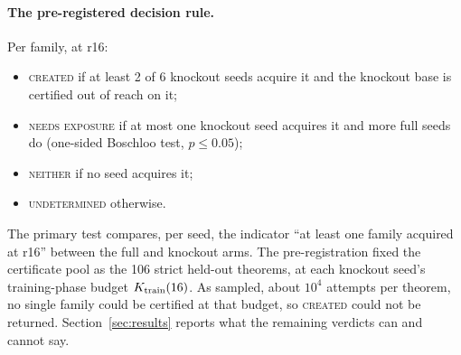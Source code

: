 \paragraph{The pre-registered decision rule.} Per family, at r16:
\begin{itemize}
\item \textsc{created} if at least 2 of 6 knockout seeds acquire it and the knockout base is certified out of reach on
it;
\item \textsc{needs exposure} if at most one knockout seed acquires it and more full seeds do (one-sided Boschloo test,
$p \leq 0.05$);
\item \textsc{neither} if no seed acquires it;
\item \textsc{undetermined} otherwise.
\end{itemize}
The primary test compares, per seed, the indicator ``at least one family acquired at r16'' between the full and
knockout arms. The pre-registration fixed the certificate pool as the 106 strict held-out theorems, at each knockout
seed's training-phase budget $K_{\mathrm{train}}(16)$. As sampled, about $10^4$ attempts per theorem, no single family could be
certified at that budget, so \textsc{created} could not be returned. Section~\ref{sec:results} reports what the
remaining verdicts can and cannot say.
